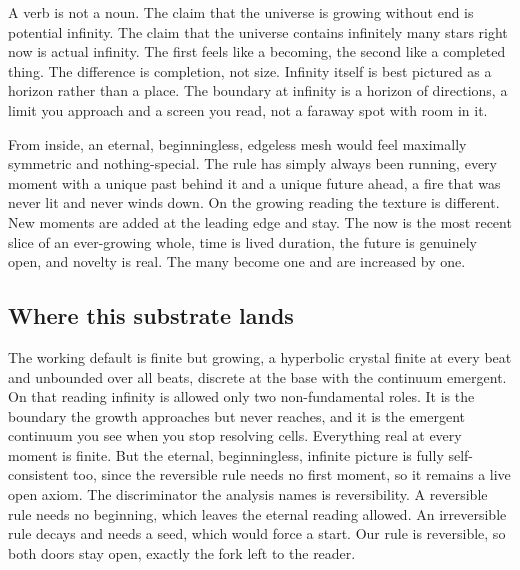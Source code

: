 A verb is not a noun. The claim that the universe is growing without end is potential infinity. The claim that the
universe contains infinitely many stars right now is actual infinity. The first feels like a becoming, the second
like a completed thing. The difference is completion, not size. Infinity itself is best pictured as a horizon
rather than a place. The boundary at infinity is a horizon of directions, a limit you approach and a screen you
read, not a faraway spot with room in it.

From inside, an eternal, beginningless, edgeless mesh would feel maximally symmetric and nothing-special. The rule
has simply always been running, every moment with a unique past behind it and a unique future ahead, a fire that
was never lit and never winds down. On the growing reading the texture is different. New moments are added at the
leading edge and stay. The now is the most recent slice of an ever-growing whole, time is lived duration, the
future is genuinely open, and novelty is real. The many become one and are increased by one.

\subsection{Where this substrate lands}

The working default is finite but growing, a hyperbolic crystal finite at every beat and unbounded over all
beats, discrete at the base with the continuum emergent. On that reading infinity is allowed only two
non-fundamental roles. It is the boundary the growth approaches but never reaches, and it is the emergent
continuum you see when you stop resolving cells. Everything real at every moment is finite. But the eternal,
beginningless, infinite picture is fully self-consistent too, since the reversible rule needs no first moment, so
it remains a live open axiom. The discriminator the analysis names is reversibility. A reversible rule needs no
beginning, which leaves the eternal reading allowed. An irreversible rule decays and needs a seed, which would
force a start. Our rule is reversible, so both doors stay open, exactly the fork left to the reader.
